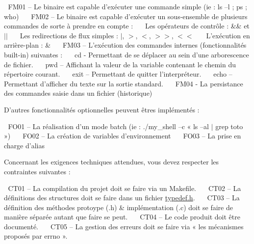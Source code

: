  F\+M01 – Le binaire est capable d’exécuter une commande simple (ie \+: ls –l ; ps ; who) ~\newline
  F\+M02 – Le binaire est capable d’exécuter un sous-\/ensemble de plusieurs commandes de sorte à prendre en compte \+: ~\newline
  Les opérateurs de contrôle \+: \&\& et $\vert$$\vert$ ~\newline
  Les redirections de flux simples \+: $\vert$, $>$, $<$, $>$$>$, $<$$<$ ~\newline
  L’exécution en arrière-\/plan \+: \& ~\newline
  F\+M03 – L’exécution des commandes internes (fonctionnalités built-\/in) suivantes \+: ~\newline
  cd -\/ Permettant de se déplacer au sein d’une arborescence de fichier. ~\newline
  pwd – Affichant la valeur de la variable contenant le chemin du répertoire courant. ~\newline
  exit – Permettant de quitter l’interpréteur. ~\newline
  echo – Permettant d’afficher du texte sur la sortie standard. ~\newline
  F\+M04 -\/ La persistance des commandes saisie dans un fichier (historique) ~\newline


D’autres fonctionnalités optionnelles peuvent êtres implémentés \+: ~\newline


 F\+O01 – La réalisation d’un mode batch (ie \+: ./my\+\_\+shell –c « ls –al $\vert$ grep toto ») ~\newline
  F\+O02 – La création de variables d’environnement ~\newline
  F\+O03 – La prise en charge d’alias ~\newline


Concernant les exigences techniques attendues, vous devez respecter les contraintes suivantes \+: ~\newline


 C\+T01 – La compilation du projet doit se faire via un Makefile. ~\newline
  C\+T02 – La définitions des structures doit se faire dans un fichier \hyperlink{typedef_8h}{typedef.\+h}. ~\newline
  C\+T03 – La définition des méthodes protoype (.h) \& implémentation (.c) doit se faire de manière séparée autant que faire se peut. ~\newline
  C\+T04 – Le code produit doit être documenté. ~\newline
  C\+T05 – La gestion des erreurs doit se faire via « les mécanismes proposés par errno ».~\newline


